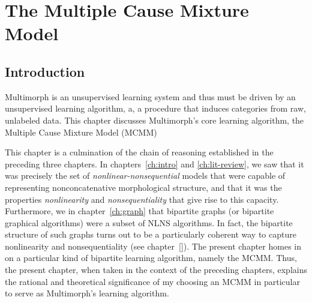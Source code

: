 \chapter{The Multiple Cause Mixture Model}
\label{ch:MCMM}

\section{Introduction}
\label{sec:mcmm:intro}
Multimorph is an unsupervised learning system and thus must be
driven by an unsupervised learning algorithm, a, 
a procedure that induces categories from raw, unlabeled data.
This chapter discusses Multimorph's core learning algorithm, the Multiple Cause Mixture Model (MCMM) \citep{saund:94} 

This chapter is a culmination of the chain of reasoning established in the preceding three chapters.
In chapters~\ref{ch:intro} and \ref{ch:lit-review}, we saw that it was precisely 
the set of \emph{nonlinear-nonsequential} models that were capable of representing 
nonconcatenative morphological structure, and that it was the properties \emph{nonlinearity}
and \emph{nonsequentiality} that give rise to this capacity. Furthermore, we in 
chapter~\ref{ch:graph} that bipartite graphs (or bipartite graphical algorithms) were a 
subset of NLNS algorithms. In fact, the bipartite structure of such graphs turns out to 
be a particularly coherent way to capture nonlinearity and nonsequentiality (see chapter~\ref{}).
The present chapter homes in on a particular kind of bipartite learning algorithm, namely 
the MCMM. Thus, the present chapter, when taken in the context of the preceding chapters, 
explains the rational and theoretical significance of my choosing an MCMM 
in particular to serve as Multimorph's learning algorithm.




